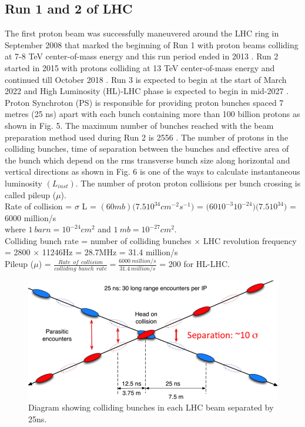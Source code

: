 \subsection {Run 1 and 2 of LHC}
The first proton beam was successfully maneuvered around the LHC ring in September 2008 that marked the beginning of Run 1 with proton beams colliding at 7-8 TeV center-of-mass energy and this run period ended in 2013 \cite{cmsrun} \cite{Alemany-Fernandez:1631030}. Run 2 started in 2015 with protons colliding at 13 TeV center-of-mass energy and continued till October 2018 \cite{Wenninger:2668326}. Run 3 is expected to begin at the start of March 2022 and High Luminosity (HL)-LHC phase is expected to begin in mid-2027 \cite{Dainese:2019rgk}. Proton Synchroton (PS) is responsible for providing proton bunches spaced 7 metres (25 ns) apart with each bunch containing more than 100 billion protons as shown in Fig. 5. The maximum number of bunches reached with the beam preparation method used during Run 2 is 2556 \cite{Wenninger:2668326}. The number of protons in the colliding bunches, time of separation between the bunches and effective area of the bunch which depend on the rms transverse bunch size along horizontal and vertical directions as shown in Fig. 6 is one of the ways to calculate instantaneous luminosity $(L_{inst})$. The number of proton proton collisions per bunch crossing is called pileup ($\mu$).\\

Rate of collision = $\sigma$ L = $(60 mb) (7.5 $\times$ 10^{34} cm^{-2} s^{-1})$ = $(60 $\times$ 10^{-3} $\times$ 10^{-24}) (7.5 $\times$ 10^{34})$ = 6000 million/s \\ 

where $1 \:barn = 10^{-24} cm^2$ and $1 \:mb = 10^{-27} cm^2$.\\

Colliding bunch rate = number of colliding bunches $\times$ LHC revolution frequency = 2800 $\times$ 11246\:Hz = 28.7\:MHz = 31.4 \:million/s \\

Pileup ($\mu$) = $\frac{Rate \:\:of \:\:collision}{colliding \:\:bunch\:\: rate} = \frac{6000 \:million/s}{31.4 \:million/s}$ = 200   for HL-LHC.    \\


\begin{figure}[H]
  \centering
  \includegraphics[width=0.6\columnwidth]{./LHCReport_1_image_cut.png}
  \caption{ \onehalfspacing Diagram showing colliding bunches in each LHC beam separated by 25ns.}
  \label{fig:CMS}
\end{figure}


